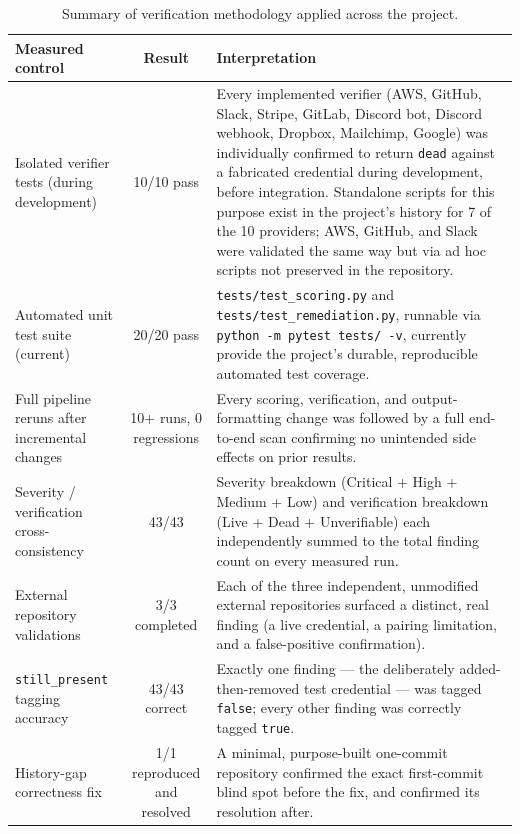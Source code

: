 \documentclass[12pt]{article}
\begin{document}
\begin{table}[h]
\centering
\begin{tabularx}{\textwidth}{|p{}|c|Y|}
\hline
\textbf{Measured control} & \textbf{Result} & \textbf{Interpretation} \\
\hline
Isolated verifier tests (during development) & 10/10 pass & Every implemented verifier (AWS, GitHub, Slack, Stripe, GitLab, Discord bot, Discord webhook, Dropbox, Mailchimp, Google) was individually confirmed to return \texttt{dead} against a fabricated credential during development, before integration. Standalone scripts for this purpose exist in the project's history for 7 of the 10 providers; AWS, GitHub, and Slack were validated the same way but via ad hoc scripts not preserved in the repository. \\
Automated unit test suite (current) & 20/20 pass & \texttt{tests/test\_scoring.py} and \texttt{tests/test\_remediation.py}, runnable via \texttt{python -m pytest tests/ -v}, currently provide the project's durable, reproducible automated test coverage. \\
Full pipeline reruns after incremental changes & 10+ runs, 0 regressions & Every scoring, verification, and output-formatting change was followed by a full end-to-end scan confirming no unintended side effects on prior results. \\
Severity / verification cross-consistency & 43/43 & Severity breakdown (Critical + High + Medium + Low) and verification breakdown (Live + Dead + Unverifiable) each independently summed to the total finding count on every measured run. \\
External repository validations & 3/3 completed & Each of the three independent, unmodified external repositories surfaced a distinct, real finding (a live credential, a pairing limitation, and a false-positive confirmation). \\
\texttt{still\_present} tagging accuracy & 43/43 correct & Exactly one finding --- the deliberately added-then-removed test credential --- was tagged \texttt{false}; every other finding was correctly tagged \texttt{true}. \\
History-gap correctness fix & 1/1 reproduced and resolved & A minimal, purpose-built one-commit repository confirmed the exact first-commit blind spot before the fix, and confirmed its resolution after. \\
\hline
\end{tabularx}
\caption{Summary of verification methodology applied across the project.}
\label{tab:measured-outcomes}
\end{table}
\end{document}
